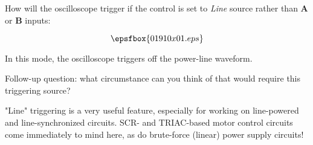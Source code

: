 

How will the oscilloscope trigger if the control is set to {\it Line} source rather than {\bf A} or {\bf B} inputs:

$$\epsfbox{01910x01.eps}$$







In this mode, the oscilloscope triggers off the power-line waveform.

\vskip 10pt

Follow-up question: what circumstance can you think of that would require this triggering source?







"Line" triggering is a very useful feature, especially for working on line-powered and line-synchronized circuits.  SCR- and TRIAC-based motor control circuits come immediately to mind here, as do brute-force (linear) power supply circuits!




